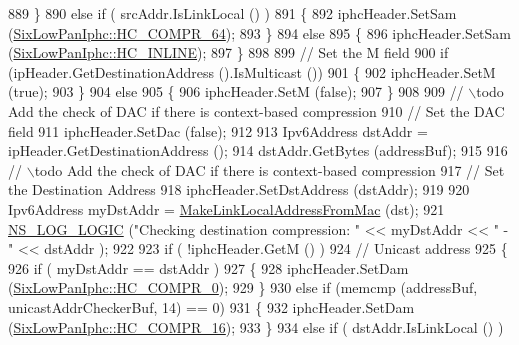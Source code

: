 \begin{DoxyCode}
889         \}
890       \textcolor{keywordflow}{else} \textcolor{keywordflow}{if} ( srcAddr.IsLinkLocal () )
891         \{
892           iphcHeader.SetSam (\hyperlink{classns3_1_1SixLowPanIphc_a384e6b68c86e9d9a07c923dbc21a6843a79b29ccd0370a00b3e182abee52ea59a}{SixLowPanIphc::HC\_COMPR\_64});
893         \}
894       \textcolor{keywordflow}{else}
895         \{
896           iphcHeader.SetSam (\hyperlink{classns3_1_1SixLowPanIphc_a384e6b68c86e9d9a07c923dbc21a6843a67481ea7303a3a3bcdd03f14630a1e42}{SixLowPanIphc::HC\_INLINE});
897         \}
898 
899       \textcolor{comment}{// Set the M field}
900       \textcolor{keywordflow}{if} (ipHeader.GetDestinationAddress ().IsMulticast ())
901         \{
902           iphcHeader.SetM (\textcolor{keyword}{true});
903         \}
904       \textcolor{keywordflow}{else}
905         \{
906           iphcHeader.SetM (\textcolor{keyword}{false});
907         \}
908 
909       \textcolor{comment}{// \(\backslash\)todo Add the check of DAC if there is context-based compression}
910       \textcolor{comment}{// Set the DAC field}
911       iphcHeader.SetDac (\textcolor{keyword}{false});
912 
913       Ipv6Address dstAddr = ipHeader.GetDestinationAddress ();
914       dstAddr.GetBytes (addressBuf);
915 
916       \textcolor{comment}{// \(\backslash\)todo Add the check of DAC if there is context-based compression}
917       \textcolor{comment}{// Set the Destination Address}
918       iphcHeader.SetDstAddress (dstAddr);
919 
920       Ipv6Address myDstAddr = \hyperlink{classns3_1_1SixLowPanNetDevice_acf66b0ff019d0f1b88212d452044696e}{MakeLinkLocalAddressFromMac} (dst);
921       \hyperlink{group__logging_ga88acd260151caf2db9c0fc84997f45ce}{NS\_LOG\_LOGIC} (\textcolor{stringliteral}{"Checking destination compression: "} << myDstAddr << \textcolor{stringliteral}{" - "} << dstAddr );
922 
923       \textcolor{keywordflow}{if} ( !iphcHeader.GetM () )
924       \textcolor{comment}{// Unicast address}
925         \{
926           \textcolor{keywordflow}{if} ( myDstAddr == dstAddr )
927             \{
928               iphcHeader.SetDam (\hyperlink{classns3_1_1SixLowPanIphc_a384e6b68c86e9d9a07c923dbc21a6843a20c6daaf8cc1cfec17270484cec677c0}{SixLowPanIphc::HC\_COMPR\_0});
929             \}
930           \textcolor{keywordflow}{else} \textcolor{keywordflow}{if} (memcmp (addressBuf, unicastAddrCheckerBuf, 14) == 0)
931             \{
932               iphcHeader.SetDam (\hyperlink{classns3_1_1SixLowPanIphc_a384e6b68c86e9d9a07c923dbc21a6843a492caa9d3c810686e9e3f1c35ef39fd9}{SixLowPanIphc::HC\_COMPR\_16});
933             \}
934           \textcolor{keywordflow}{else} \textcolor{keywordflow}{if} ( dstAddr.IsLinkLocal () )

\end{DoxyCode}
